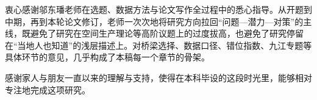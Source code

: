 衷心感谢邬东璠老师在选题、数据方法与论文写作全过程中的悉心指导。从开题到中期，再到本轮论文修订，老师一次次地将研究方向拉回``问题---潜力---对策''的主线，既避免了研究在空间生产理论等高阶议题上的过度拔高，也避免了研究停留在``当地人也知道''的浅层描述上。对桥梁选择、数据口径、错位指数、九江专题等具体环节的意见，几乎构成了本稿每一个章节的骨架。

感谢家人与朋友一直以来的理解与支持，使得在本科毕设的这段时光里，能够相对专注地完成这项研究。
